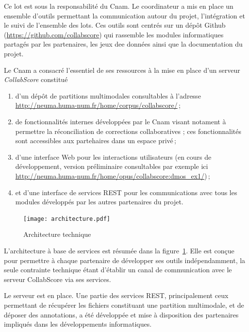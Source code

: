 \documentclass[11pt]{article}
\begin{document}
Ce lot est sous la responsabilité du Cnam. Le coordinateur a mis en place un ensemble d'outils permettant 
la communication autour du projet, l'intégration et le suivi de l'ensemble des lots. Ces outils sont
centrés sur un dépôt Github (\url{https://github.com/collabscore})
qui rassemble les modules informatiques partagés par les partenaires, les jeux dee données 
ainsi que la documentation du projet.

Le Cnam a consacré l'essentiel de ses ressources à la mise en place d'un serveur \emph{CollabScore} constitué

\begin{enumerate}
 \item d'un dépôt de partitions multimodales consultables à l'adresse \url{http://neuma.huma-num.fr/home/corpus/collabscore/}\,;
  \item  de fonctionnalités internes développées par le Cnam visant notament à permettre la réconciliation 
       de corrections collaboratives ; ces fonctionnalités sont accessibles aux partehaires dans un espace privé\,;
   \item  d'une interface Web pour les interactions utilisateurs (en cours de développement, version
         préliminaire consultables par exemple ici \url{http://neuma.huma-num.fr/home/opus/collabscore:dmos_ex1/})\,; 
  \item et d'une interface de services REST pour les communications avec tous les modules développés par les autres 
      partenaires du projet.
\end{enumerate}

  \begin{figure}[htb]
  \begin{center}
   \texttt{[image: architecture.pdf]}
    \caption{Architecture technique}
    \label{architecture}
    \end{center}
  \end{figure}
  
L'architecture à base de services est résumée dans la figure~\ref{architecture}.
Elle est conçue pour permettre à chaque partenaire de développer ses outils indépendamment, 
la seule contrainte technique étant
d'établir un canal de communication avec le serveur CollabScore via ses services.  

Le serveur est en place. Une partie des services REST, principalement ceux permettant 
de récupérer les fichiers constituant une partition multimodale, et de déposer des annotations, a 
été développée et mise à disposition des partenaires impliqués dans les développements informatiques.
\end{document}
